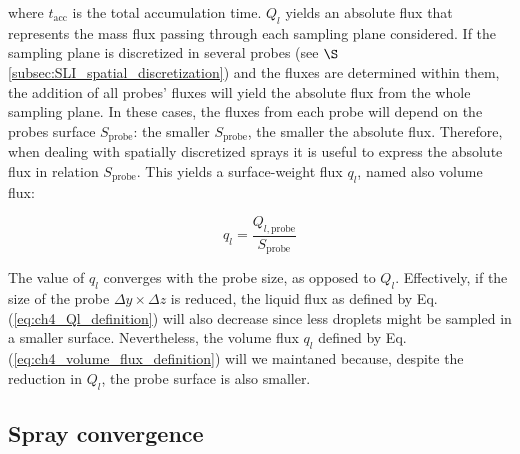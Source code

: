 where $t_\mathrm{acc}$ is the total accumulation time. $Q_l$ yields an absolute flux that represents the mass flux passing through each sampling plane considered. If the sampling plane is discretized in several probes (see $\S$\ref{subsec:SLI_spatial_discretization}) and the fluxes are determined within them, the addition of all probes' fluxes will yield the absolute flux from the whole sampling plane. In these cases, the fluxes from each probe will depend on the probes surface $S_\mathrm{probe}$: the smaller $S_\mathrm{probe}$, the smaller the absolute flux. Therefore, when dealing with spatially discretized sprays it is useful to express the absolute flux in relation $S_\mathrm{probe}$. This yields a surface-weight flux $q_l$, named also volume flux:

\begin{equation}
\label{eq:ch4_volume_flux_definition}
q_l = \frac{Q_{l,\mathrm{probe}}}{S_\mathrm{probe}}
\end{equation}

The value of $q_l$ converges with the probe size, as opposed to $Q_l$. Effectively, if the size of the probe $\Delta y \times \Delta z$ is reduced, the liquid flux as defined by Eq. (\ref{eq:ch4_Ql_definition}) will also decrease since less droplets might be sampled in a smaller surface. Nevertheless, the volume flux $q_l$ defined by Eq. (\ref{eq:ch4_volume_flux_definition}) will we maintaned because, despite the reduction in $Q_l$, the probe surface is also smaller.

\clearpage

%




\subsection{Spray convergence}
\label{subsec:SLI_spray_convergence}

